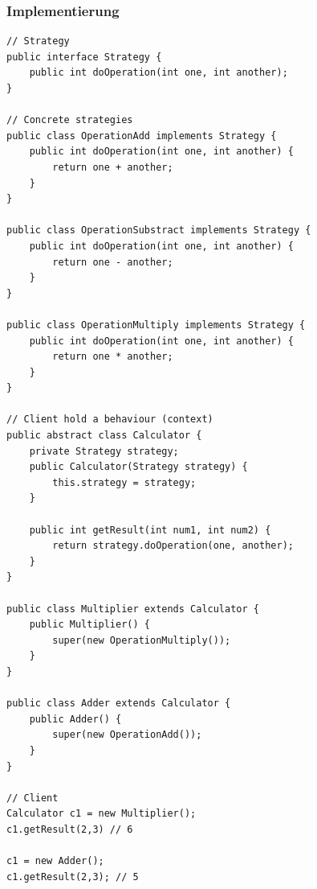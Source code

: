 \subsubsection{Implementierung}
\begin{lstlisting}
// Strategy
public interface Strategy {
	public int doOperation(int one, int another);
}

// Concrete strategies
public class OperationAdd implements Strategy {
	public int doOperation(int one, int another) {
		return one + another;
	}
}

public class OperationSubstract implements Strategy {
	public int doOperation(int one, int another) {
		return one - another;
	}
}

public class OperationMultiply implements Strategy {
	public int doOperation(int one, int another) {
		return one * another;
	}
}

// Client hold a behaviour (context)
public abstract class Calculator {
	private Strategy strategy;
	public Calculator(Strategy strategy) {
		this.strategy = strategy;
	}
	
	public int getResult(int num1, int num2) {
		return strategy.doOperation(one, another);
	}
}

public class Multiplier extends Calculator {
	public Multiplier() {
		super(new OperationMultiply());
	}
}

public class Adder extends Calculator {
	public Adder() {
		super(new OperationAdd());
	}
}

// Client
Calculator c1 = new Multiplier();
c1.getResult(2,3) // 6

c1 = new Adder();
c1.getResult(2,3); // 5
\end{lstlisting}


\clearpage


